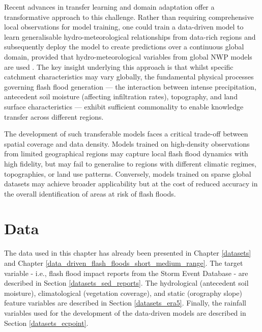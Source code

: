 Recent advances in transfer learning and domain adaptation offer a transformative approach to this challenge. Rather than requiring comprehensive local observations for model training, one could train a data-driven model to learn generalisable hydro-meteorological relationships from data-rich regions and subsequently deploy the model to create predictions over a continuous global domain, provided that hydro-meteorological variables from global NWP models are used \citep{Gupta_2014, Kratzert_2024}. The key insight underlying this approach is that whilst specific catchment characteristics may vary globally, the fundamental physical processes governing flash flood generation — the interaction between intense precipitation, antecedent soil moisture (affecting infiltration rates), topography, and land surface characteristics — exhibit sufficient commonality to enable knowledge transfer across different regions.

The development of such transferable models faces a critical trade-off between spatial coverage and data density. Models trained on high-density observations from limited geographical regions may capture local flash flood dynamics with high fidelity, but may fail to generalise to regions with different climatic regimes, topographies, or land use patterns. Conversely, models trained on sparse global datasets may achieve broader applicability but at the cost of reduced accuracy in the overall identification of areas at risk of flash floods. 


\section{Data}
\label{regional_to_global_training_data}

The data used in this chapter has already been presented in Chapter \ref{datasets} and Chapter \ref{data_driven_flash_floods_short_medium_range}. The target variable - i.e., flash flood impact reports from the Storm Event Database - are described in Section \ref{datasets_sed_reports}. The hydrological (antecedent soil moisture), climatological (vegetation coverage), and static (orography slope) feature variables are described in Section \ref{datasets_era5}. Finally, the rainfall variables used for the development of the data-driven models are described in Section \ref{datasets_ecpoint}.

